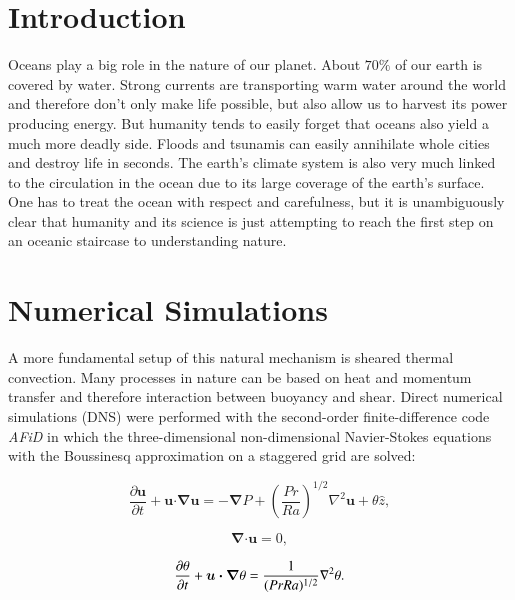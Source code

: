 \documentclass[final,5p,times,twocolumn]{elsarticle}
\begin{document}

\section{Introduction}
\label{sec:Introduction}

Oceans play a big role in the nature of our planet. About $ 70 \% $ of our earth
is covered by water. Strong currents are transporting warm water around the world
and therefore don't only make life possible, but also allow us to harvest its
power producing energy. But humanity tends to easily forget that oceans also
yield a much more deadly side. Floods and tsunamis can easily annihilate whole
cities and destroy life in seconds. The earth's climate system is also very much
linked to the circulation in the ocean due to its large coverage of the earth's surface.
One has to treat the ocean with respect and carefulness, but it is unambiguously
clear that humanity and its science is just attempting to reach the first step on
an oceanic staircase to understanding nature.

\section{Numerical Simulations}

A more fundamental setup of this natural mechanism is sheared thermal convection.
Many processes in nature can be based on heat and momentum
transfer and therefore interaction between buoyancy and shear. Direct
numerical simulations (DNS) were performed with the second-order finite-difference
code \textit{AFiD} \cite{poe15c} in which the three-dimensional non-dimensional
Navier-Stokes equations with the Boussinesq approximation on a staggered grid are solved:

\begin{equation} %
\frac{\partial \boldsymbol{u}}{\partial t} + \boldsymbol{u} \bm{\cdot} \bm{\nabla} \boldsymbol{u} =-\bm{\nabla} P + \left(\frac{Pr}{Ra} \right)^{1/2} \nabla^2\boldsymbol{u}+\theta \hat{z}, 
\label{eqn:NS}
\end{equation}

\begin{equation} %
\bm{\nabla} \bm{\cdot} \boldsymbol{u} =0,
\label{eqn:div}
\end{equation}

\begin{equation} %
\frac{\partial \theta}{\partial t} + \boldsymbol{u} \bm{\cdot} \bm{\nabla} \theta = \frac{1}{(Pr Ra)^{1/2}} \nabla ^2 \theta.
\label{eqn:temp} \\[8pt]
\end{equation}
\end{document}
